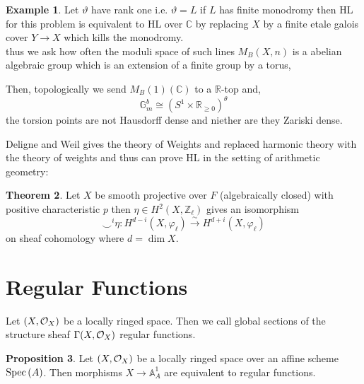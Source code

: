 \documentclass[12pt]{extarticle}
\newcommand{\Z}{\mathbb{Z}}
\newcommand{\R}{\mathbb{R}}
\theoremstyle{definition}
\newtheorem{theorem}{Theorem}[section]
\newtheorem{proposition}[theorem]{Proposition}
\newtheorem{example}[theorem]{Example}
\newenvironment{definition}[1][Definition:]{\begin{trivlist}
\item[\hskip \labelsep {\bfseries #1}]}{\end{trivlist}}
\newcommand{\C}{\mathbb{C}}
\newcommand{\A}{\mathbb{A}}
\begin{document}
\begin{example}
Let $\vartheta$ have rank one i.e. $\vartheta = L$ if $L$ has finite monodromy then HL for this problem is equivalent to HL over $\C$ by replacing $X$ by a finite etale galois cover $Y \to X$ which kills the monodromy. 
\bigskip\\
thus we ask how often the moduli space of such lines $M_B(X, n)$ is a abelian algebraic group which is an extension of a finite group by a torus,
\begin{center}
\end{center}
Then, topologically we send $M_B(1)(\C)$ to a $\R$-top and,
\[ \mathbb{G}_m^b \cong (S^1 \times \R_{\ge 0} )^{\theta} \]
the torsion points are not Hausdorff dense and niether are they Zariski dense. 
\end{example}

Deligne and Weil gives the theory of Weights and replaced harmonic theory with the theory of weights and thus can prove HL in the setting of arithmetic geometry:

\begin{theorem}
Let $X$ be smooth projective over $F$ (algebraically closed) with positive characteristic $p$ then $\eta \in H^2(X, \Z_\ell)$ gives an isomorphism
\[ \smile^i \eta : H^{d - i}(X, \varphi_\ell) \xrightarrow{\sim} H^{d + i}(X, \varphi_\ell) \]
on sheaf cohomology where $d = \dim{X}$. 
\end{theorem}

\section{Regular Functions}

\renewcommand{\A}{\mathbb{A}}
\newcommand{\val}{\mathrm{val}}

\begin{definition}
Let $(X, \mathcal{O}_{X})$ be a locally ringed space. Then we call global sections of the structure sheaf $\Gamma(X, \mathcal{O}_{X})$ regular functions.
\end{definition}

\begin{proposition}
Let $(X, \mathcal{O}_{X})$ be a locally ringed space over an affine scheme $\mathrm{Spec}\left(A\right)$. Then morphisms $X \to \A^1_A$ are equivalent to regular functions.
\end{proposition}
\end{document}
